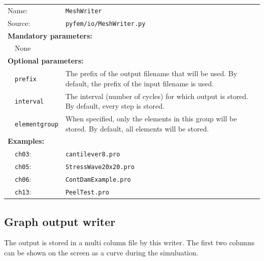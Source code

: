 \documentclass{article}
\begin{document}
\vspace{2mm}
\begin{tabular}{p{22mm}p{74mm}}
Name:         & \texttt{MeshWriter} \\
Source:  & \texttt{pyfem/io/MeshWriter.py} \\
\multicolumn{2}{l}{\textbf{Mandatory parameters:}} \\
~~None  & \\
\multicolumn{2}{l}{\textbf{Optional parameters:}} \\ 
~~\texttt{prefix} & The prefix of the output filename that will be used. By default, the prefix of the 
                    input filename is used.\\
~~\texttt{interval} & The interval (number of cycles) for which output is stored. By default, every step is
                    stored.\\
~~\texttt{elementgroup} & When specified, only the elements in this group will be stored. By default, all elements
                    will be stored.\\
\multicolumn{2}{l}{\textbf{Examples:}}\\
~~\texttt{ch03}: & \texttt{cantilever8.pro}\\
~~\texttt{ch05}: & \texttt{StressWave20x20.pro}\\
~~\texttt{ch06}: & \texttt{ContDamExample.pro}\\
~~\texttt{ch13}: & \texttt{PeelTest.pro}
\end{tabular}

\subsection{Graph output writer}

The output is stored in a multi column file by this writer. The first two columns can be shown on the screen as a curve during
the simuluation.
\end{document}
